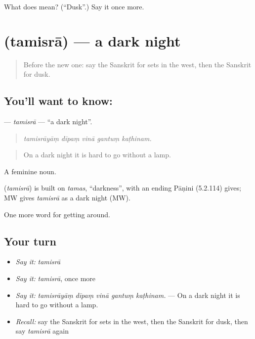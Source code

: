 \begin{tcolorbox}[breakable,colback=teal!4,colframe=teal!35!black,title={Before you move on}]
What does  mean? (\textquotedblleft{}Dusk\textquotedblright{}.) Say it once more.
\end{tcolorbox}
\section[\texorpdfstring{\sk{तमिस्रा} (tamisrā)}{तमिस्रा (tamisrā)}]{ (tamisrā) — a dark night}

\label{lesson:SA-C443-tamisra}



\begin{quote}
Before the new one: say the Sanskrit for sets in the west, then the Sanskrit for dusk.
\end{quote}

\subsection*{You'll want to know: }
\textbf{} — \emph{tamisrā} — \textquotedblleft{}a dark night\textquotedblright{}.

\begin{quote}
    
\end{quote}

\begin{quote}
\emph{tamisrāyāṃ dīpaṃ vinā gantuṃ kaṭhinam.}
\end{quote}

\begin{quote}
On a dark night it is hard to go without a lamp.
\end{quote}

A feminine noun.

\begin{cousinweb}
\textbf{} (\emph{tamisrā}) is built on \emph{tamas}, \textquotedblleft{}darkness\textquotedblright{}, with an ending Pāṇini (5.2.114) gives; MW gives \emph{tamisrā} as a dark night (MW).
\end{cousinweb}

\begin{grammarlens}[title={What you've built}]
One more word for getting around.
\end{grammarlens}

\subsection*{Your turn}
\begin{itemize}
\raggedright
  \item \emph{Say it:} \emph{tamisrā}
  \item \emph{Say it:} \emph{tamisrā}, once more
  \item \emph{Say it:} \emph{tamisrāyāṃ dīpaṃ vinā gantuṃ kaṭhinam.} — On a dark night it is hard to go without a lamp.
  \item \emph{Recall:} say the Sanskrit for sets in the west, then the Sanskrit for dusk, then say \emph{tamisrā} again
\end{itemize}

